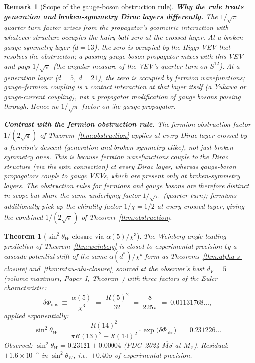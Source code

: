 \documentclass[12pt,a4paper]{article}
\newtheorem{theorem}{Theorem}[section]
\newtheorem*{remark}{Remark}
\begin{document}
\begin{remark}[Scope of the gauge-boson obstruction rule]
\medskip\noindent\textbf{Why the rule treats generation and broken-symmetry Dirac layers differently.}
The $1/\sqrt{\pi}$ quarter-turn factor arises from the propagator's
geometric interaction with whatever structure occupies the hairy-ball
zero at the crossed layer. At a broken-gauge-symmetry layer ($d=13$),
the zero is occupied by the Higgs VEV that resolves the obstruction;
a passing gauge-boson propagator mixes with this VEV and pays
$1/\sqrt{\pi}$ (the angular measure of the VEV's quarter-turn on
$S^{12}$). At a generation layer ($d=5$, $d=21$), the zero is occupied
by fermion wavefunctions; gauge--fermion coupling is a contact
interaction at that layer itself (a Yukawa or gauge-current coupling),
not a propagator modification of gauge bosons passing through. Hence
no $1/\sqrt{\pi}$ factor on the gauge propagator.

\medskip\noindent\textbf{Contrast with the fermion obstruction rule.}
The fermion obstruction factor $1/(2\sqrt{\pi})$ of
Theorem~\ref{thm:obstruction} applies at \emph{every} Dirac layer
crossed by a fermion's descent (generation and broken-symmetry alike),
not just broken-symmetry ones. This is because fermion wavefunctions
couple to the Dirac structure (via the spin connection) at every Dirac
layer, whereas gauge-boson propagators couple to gauge VEVs, which are
present only at broken-symmetry layers. The obstruction rules for
fermions and gauge bosons are therefore distinct in scope but share
the same underlying factor $1/\sqrt{\pi}$ (quarter-turn); fermions
additionally pick up the chirality factor $1/\chi=1/2$ at every
crossed layer, giving the combined $1/(2\sqrt{\pi})$ of
Theorem~\ref{thm:obstruction}.
\end{remark}

\begin{theorem}[$\sin^2\theta_W$ closure via $\alpha(5)/\chi^3$]\label{thm:weinberg-closure}
The Weinberg angle leading prediction of Theorem~\ref{thm:weinberg} is closed to experimental precision by a cascade potential shift of the same $\alpha(d^*)/\chi^k$ form as Theorems~\ref{thm:alpha-s-closure} and~\ref{thm:mtau-abs-closure}, sourced at the observer's host $d_V=5$ (volume maximum, Paper~I, Theorem~) with three factors of the Euler characteristic:
\begin{equation}\label{eq:weinberg-shift}
\delta\Phi_{\mathrm{obs}} \;\equiv\; \frac{\alpha(5)}{\chi^3} \;=\; \frac{R(5)^2}{32} \;=\; \frac{8}{225\pi} \;=\; 0.01131768\ldots,
\end{equation}
applied exponentially:
\begin{equation}\label{eq:weinberg-closure}
\sin^2\theta_W \;=\; \frac{R(14)^2}{\pi R(13)^2 + R(14)^2}\cdot\exp\bigl(\delta\Phi_{\mathrm{obs}}\bigr) \;=\; 0.231226\ldots
\end{equation}
Observed: $\sin^2\theta_W = 0.23121\pm 0.00004$ (PDG~2024 $\overline{MS}$ at $M_Z$). Residual: $+1.6\times 10^{-5}$ in $\sin^2\theta_W$, i.e.\ $+0.40\sigma$ of experimental precision.
\end{theorem}
\end{document}
